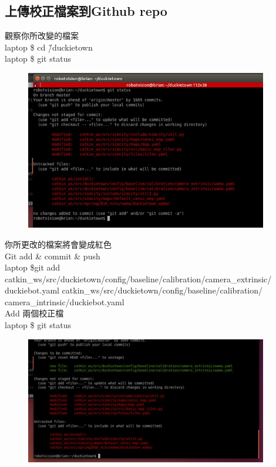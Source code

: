 \documentclass{article}
\begin{document}
\subsection{上傳校正檔案到Github repo}

觀察你所改變的檔案
\\laptop \$ cd \~/duckietown
\\laptop \$ git status
\begin{figure}[htp]
    \begin{center}
        \includegraphics[width=300pt]{pic/圖片17.jpg}
    \end{center}
\end{figure}

你所更改的檔案將會變成紅色
\\Git add \& commit \& push
\\laptop \$git add catkin\_ws/src/duckietown/config/baseline/calibration/camera\_extrinsic/ duckiebot.yaml catkin\_ws/src/duckietown/config/baseline/calibration/ camera\_intrinsic/duckiebot.yaml
\\Add 兩個校正檔
\\laptop \$ git status
\\
\begin{figure}[htp]
    \begin{center}
        \includegraphics[width=300pt]{pic/圖片18.jpg}
    \end{center}
\end{figure}
\end{document}
